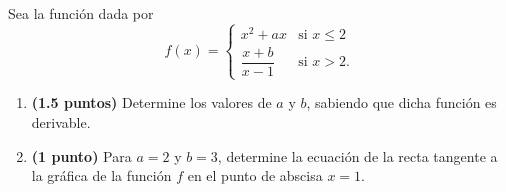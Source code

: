 
Sea la función dada por
\[
f(x)=\begin{cases}
x^2+ax & \text{si }x\leq2\\[5pt]
\dfrac{x+b}{x-1} & \text{si }x>2.
\end{cases}
\]
\begin{enumerate}[label=\alph*)]
\item \textbf{(1.5 puntos)} Determine los valores de $a$ y $b$, sabiendo que dicha función es derivable.
\item \textbf{(1 punto)} Para $a=2$ y $b=3$, determine la ecuación de la recta tangente a la gráfica de la función $f$ en el punto de abscisa $x=1$.
\end{enumerate}
